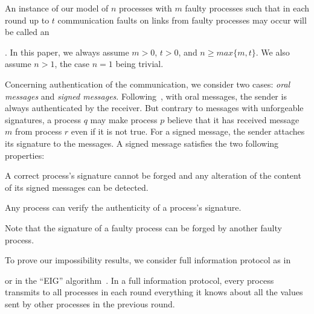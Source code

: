An instance of our model of $n$ processes with $m$ 
faulty processes such that in each round up to $t$ communication faults
on links from faulty processes may occur will be called an {. In this paper, we always assume $m>0$, $t>0$, and $n \geqslant
max\{m,t\}$. We also assume $n>1$, the case $n=1$ being trivial. 

\vspace{1em}
 Concerning authentication of the communication, we consider two cases:
 \emph{oral messages} and \emph{signed messages}.
Following~\cite{lamport1982byzantine,srikanth1987optimal}, with oral messages, the
sender is always
authenticated by the receiver. But contrary to messages with
unforgeable signatures, a process $q$ may make process $p$ believe that it has received
message $m$ from process $r$ even if it is not true.
For a signed message,  the sender attaches its
signature to the messages. 
A signed message satisfies the two following properties: 

\begin{enumeratealpha}
  \item A correct process's signature cannot be
    forged and any alteration of the content of its signed messages
    can be detected. 
  \item Any process can verify the authenticity of a process's
    signature. 
\end{enumeratealpha}
Note that the signature of a faulty process can be forged by
another faulty process. 

\vspace{1em}
To prove our impossibility results, we consider full information protocol as in 
{\cite{fischer1982lower,lamport1982byzantine} or  in  the ``EIG''
  algorithm~\cite{lynch1996distributed}. In a full information
protocol, every process transmits to all processes in each round everything it knows
about all the values sent by other processes in the previous round.

}}
